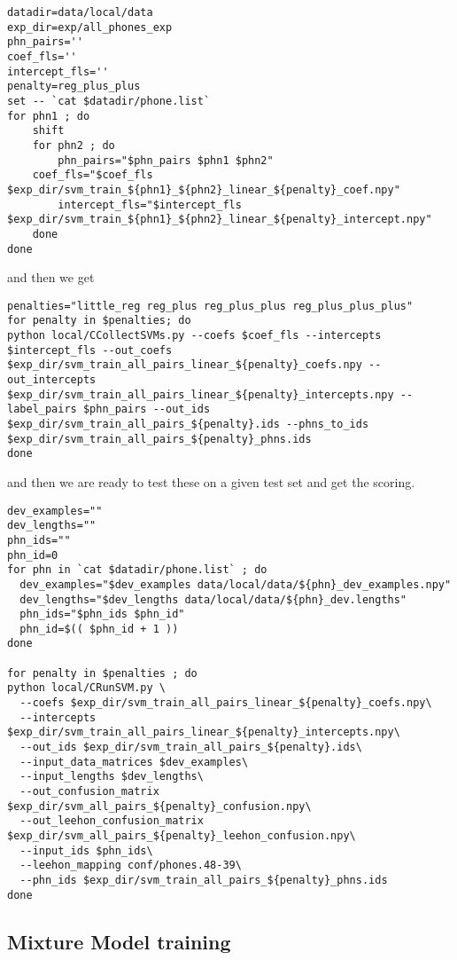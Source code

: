 \documentclass{article}
\begin{document}
\begin{verbatim}
datadir=data/local/data
exp_dir=exp/all_phones_exp
phn_pairs=''
coef_fls=''
intercept_fls=''
penalty=reg_plus_plus
set -- `cat $datadir/phone.list`
for phn1 ; do
    shift
    for phn2 ; do
        phn_pairs="$phn_pairs $phn1 $phn2"
	coef_fls="$coef_fls $exp_dir/svm_train_${phn1}_${phn2}_linear_${penalty}_coef.npy"
        intercept_fls="$intercept_fls $exp_dir/svm_train_${phn1}_${phn2}_linear_${penalty}_intercept.npy"
    done
done
\end{verbatim}
and then we get
\begin{verbatim}
penalties="little_reg reg_plus reg_plus_plus reg_plus_plus_plus"
for penalty in $penalties; do
python local/CCollectSVMs.py --coefs $coef_fls --intercepts $intercept_fls --out_coefs $exp_dir/svm_train_all_pairs_linear_${penalty}_coefs.npy --out_intercepts $exp_dir/svm_train_all_pairs_linear_${penalty}_intercepts.npy --label_pairs $phn_pairs --out_ids $exp_dir/svm_train_all_pairs_${penalty}.ids --phns_to_ids $exp_dir/svm_train_all_pairs_${penalty}_phns.ids
done

\end{verbatim}
and then we are ready to test these on a given test set and get the scoring.
\begin{verbatim}
dev_examples=""
dev_lengths=""
phn_ids=""
phn_id=0
for phn in `cat $datadir/phone.list` ; do
  dev_examples="$dev_examples data/local/data/${phn}_dev_examples.npy"
  dev_lengths="$dev_lengths data/local/data/${phn}_dev.lengths"
  phn_ids="$phn_ids $phn_id"
  phn_id=$(( $phn_id + 1 ))
done

for penalty in $penalties ; do
python local/CRunSVM.py \
  --coefs $exp_dir/svm_train_all_pairs_linear_${penalty}_coefs.npy\
  --intercepts $exp_dir/svm_train_all_pairs_linear_${penalty}_intercepts.npy\
  --out_ids $exp_dir/svm_train_all_pairs_${penalty}.ids\
  --input_data_matrices $dev_examples\
  --input_lengths $dev_lengths\
  --out_confusion_matrix $exp_dir/svm_all_pairs_${penalty}_confusion.npy\
  --out_leehon_confusion_matrix $exp_dir/svm_all_pairs_${penalty}_leehon_confusion.npy\
  --input_ids $phn_ids\
  --leehon_mapping conf/phones.48-39\
  --phn_ids $exp_dir/svm_train_all_pairs_${penalty}_phns.ids
done

\end{verbatim}

\subsection{Mixture Model training}
\end{document}
